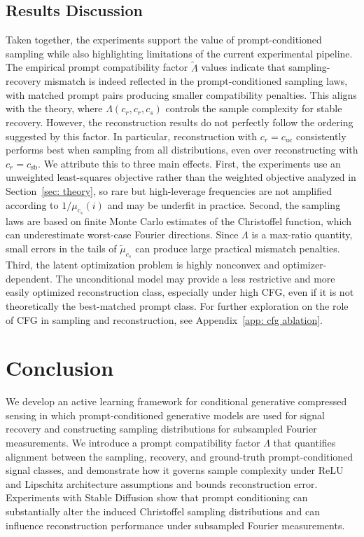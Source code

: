 \documentclass{article}
\theoremstyle{plain}
\theoremstyle{definition}
\theoremstyle{remark}
\begin{document}
\subsection{Results Discussion}
Taken together, the experiments support the value of prompt-conditioned sampling while also highlighting limitations of the current experimental pipeline.
The empirical prompt compatibility factor $\widetilde{\Lambda}$ values indicate that sampling-recovery mismatch is indeed reflected in the prompt-conditioned sampling laws, with matched prompt pairs producing smaller compatibility penalties. This aligns with the theory, where $\Lambda(c_r,c_r,c_s)$ controls the sample complexity  for stable recovery. However, the reconstruction results do not perfectly follow the ordering suggested by this factor. In particular, reconstruction with $c_r=c_{\mathrm{uc}}$ consistently performs best when sampling from all distributions, even over reconstructing with $c_r = c_{\mathrm{sb}}$. 
We attribute this to three main effects. First, the experiments use an unweighted least-squares objective rather than the weighted objective analyzed in Section~\ref{sec: theory}, so rare but high-leverage frequencies are not amplified according to $1/\mu_{c_s}(i)$ and may be underfit in practice. Second, the sampling laws are based on finite Monte Carlo estimates of the Christoffel function, which can underestimate worst-case Fourier directions. Since $\Lambda$ is a max-ratio quantity, small errors in the tails of $\widetilde{\mu}_{c_s}$ can produce large practical mismatch penalties. Third, the latent optimization problem is highly nonconvex and optimizer-dependent. The unconditional model may provide a less restrictive and more easily optimized reconstruction class, especially under high CFG, even if it is not theoretically the best-matched prompt class. For further exploration on the role of CFG in sampling and reconstruction, see Appendix~\ref{app: cfg ablation}.

\section{Conclusion}\label{sec: conclusion}

We develop an active learning framework for conditional generative compressed sensing in which prompt-conditioned generative models are used for signal recovery and constructing sampling distributions for subsampled Fourier measurements. We introduce a prompt compatibility factor $\Lambda$ that quantifies alignment between the sampling, recovery, and ground-truth prompt-conditioned signal classes, and demonstrate how it governs sample complexity under ReLU and Lipschitz architecture assumptions and bounds reconstruction error. Experiments with Stable Diffusion show that prompt conditioning can substantially alter the induced Christoffel sampling distributions and can influence reconstruction performance under subsampled Fourier measurements.
\end{document}
